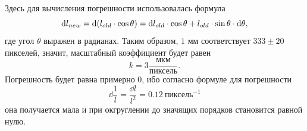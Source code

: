 \documentclass[12pt]{article}
\begin{document}
Здесь для вычисления погрешности использовалась формула
\begin{equation}
	\dd l_{new} = \dd \qty(l_{old}\cdot\cos{\theta}) = \dd l_{old} \cdot \cos{\theta} + l_{old} \cdot \sin{\theta} \cdot \dd \theta,
\end{equation}
где угол $\theta$ выражен в радианах. Таким образом, $1$ мм соответствует $333\pm20$ пикселей, значит, масштабный коэффициент будет равен
\begin{equation}
	k = 3 \dfrac{\text{мкм}}{\text{пиксель}}.
\end{equation}
Погрешность будет равна примерно $0$, ибо согласно формуле для погрешности
\begin{equation}
	\dd \dfrac1l = \dfrac{\dd l}{l^2} = 0.12\ {\text{пиксель}}^{-1}
\end{equation}
она получается мала и при окгруглении до значящих порядков становится равной нулю.
\end{document}

